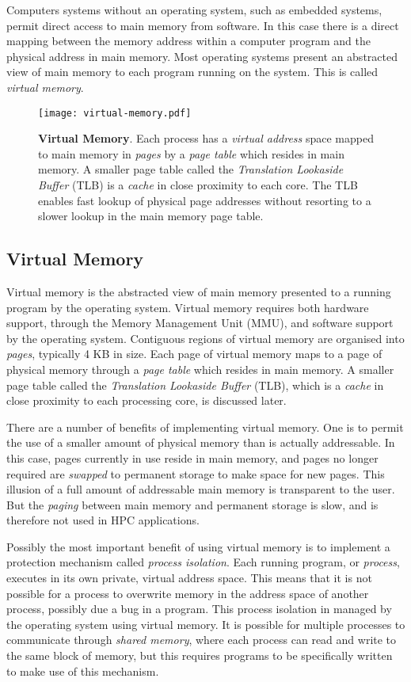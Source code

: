 Computers systems without an operating system, such as embedded systems, permit direct access to main memory from software. In this case there is a direct mapping between the memory address within a computer program and the physical address in main memory. Most operating systems present an abstracted view of main memory to each program running on the system. This is called \emph{virtual memory}.
 
    
\begin{figure}
	\centering	
	\texttt{[image: virtual-memory.pdf]}
	\caption{\textbf{Virtual Memory}. Each process has a \emph{virtual address} space mapped to main memory in \emph{pages} by a \emph{page table} which resides in main memory. A smaller page table called the \emph{Translation Lookaside Buffer} (TLB) is a \emph{cache} in close proximity to each core. The TLB enables fast lookup of physical page addresses without resorting to a slower lookup in the main memory page table.}
\end{figure}


\subsection{Virtual Memory}

Virtual memory is the abstracted view of main memory presented to a running program by the operating system. Virtual memory requires both hardware support, through the Memory Management Unit (MMU), and software support by the operating system. Contiguous regions of virtual memory are organised into \emph{pages}, typically 4 KB in size. Each page of virtual memory maps to a page of physical memory through a \emph{page table} which resides in main memory. A smaller page table called the \emph{Translation Lookaside Buffer} (TLB), which is a \emph{cache} in close proximity to each processing core, is discussed later.

There are a number of benefits of implementing virtual memory. One is to permit the use of a smaller amount of physical memory than is actually addressable. In this case, pages currently in use reside in main memory, and pages no longer required are \emph{swapped} to permanent storage to make space for new pages. This illusion of a full amount of addressable main memory is transparent to the user. But the \emph{paging} between main memory and permanent storage is slow, and is therefore not used in HPC applications.

Possibly the most important benefit of using virtual memory is to implement a protection mechanism called \emph{process isolation}. Each running program, or \emph{process}, executes in its own private, virtual address space. This means that it is not possible for a process to overwrite memory in the address space of another process, possibly due a bug in a program. This process isolation in managed by the operating system using virtual memory. It is possible for multiple processes to communicate through \emph{shared memory}, where each process can read and write to the same block of memory, but this requires programs to be specifically written to make use of this mechanism. 

